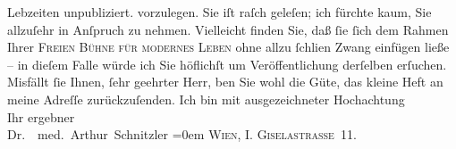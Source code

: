 \begin{ledgroupsized}[t]{13cm}
{{{                  Lebzeiten unpubliziert.}}}\label{K_L00005-1h} vorzulegen. Sie iſt raſch geleſen; ich fürchte
               kaum, Sie allzuſehr in Anſpruch zu nehmen. Vielleicht finden Sie, daß ſie ſich dem
               Rahmen Ihrer \textsc{Freien Bühne für modernes Leben} ohne allzu ſchli{\geminationm}en Zwang einfügen ließe – in
               dieſem Falle würde ich Sie höflichſt um Veröffentlichung derſelben erſuchen. Misfällt
               ſie Ihnen, ſehr geehrter Herr, {\pb}ben Sie wohl die Güte, das kleine Heft an meine Adreſſe zurückzuſenden.\pend
           \pstart
           Ich bin mit ausgezeichneter Hochachtung{\\[\baselineskip]}Ihr ergebner{\\[\baselineskip]}\spacefill\mbox{Dr.  med. Arthur Schnitzler}\pend
           \leftskip=0em{}\pstart
           \noindent{}\textsc{Wien, I. Giselastraße 11.}\pend
           
         
         \endnumbering{}\end{ledgroupsized}  \newcommand{\dateiname}{L00005}\newcommand{\titel}{Arthur Schnitzler an Wilhelm Bölsche, [Anfang September] 1890}\newcommand{\editorInnen}{Martin Anton Müller und Gerd-Hermann Susen}
      